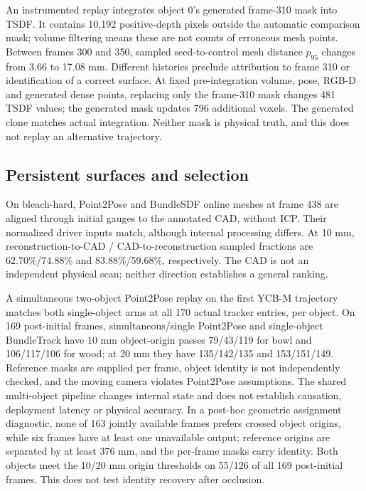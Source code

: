 \documentclass[10pt,journal]{IEEEtran}
\begin{document}
An instrumented replay integrates object 0's generated frame-310 mask into TSDF. It contains 10,192 positive-depth pixels outside the automatic comparison mask; volume filtering means these are not counts of erroneous mesh points. Between frames 300 and 350, sampled seed-to-control mesh distance $p_{95}$ changes from 3.66 to 17.08 mm. Different histories preclude attribution to frame 310 or identification of a correct surface. At fixed pre-integration volume, pose, RGB-D and generated dense points, replacing only the frame-310 mask changes 481 TSDF values; the generated mask updates 796 additional voxels. The generated clone matches actual integration. Neither mask is physical truth, and this does not replay an alternative trajectory.

\subsection{Persistent surfaces and selection}
On bleach-hard, Point2Pose and BundleSDF online meshes at frame 438 are aligned through initial gauges to the annotated CAD, without ICP. Their normalized driver inputs match, although internal processing differs. At 10 mm, reconstruction-to-CAD / CAD-to-reconstruction sampled fractions are 62.70\%/74.88\% and 83.88\%/59.68\%, respectively. The CAD is not an independent physical scan; neither direction establishes a general ranking.

A simultaneous two-object Point2Pose replay on the first YCB-M trajectory matches both single-object arms at all 170 actual tracker entries, per object. On 169 post-initial frames, simultaneous/single Point2Pose and single-object BundleTrack have 10 mm object-origin passes 79/43/119 for bowl and 106/117/106 for wood; at 20 mm they have 135/142/135 and 153/151/149. Reference masks are supplied per frame, object identity is not independently checked, and the moving camera violates Point2Pose assumptions. The shared multi-object pipeline changes internal state and does not establish causation, deployment latency or physical accuracy. In a post-hoc geometric assignment diagnostic, none of 163 jointly available frames prefers crossed object origins, while six frames have at least one unavailable output; reference origins are separated by at least 376 mm, and the per-frame masks carry identity. Both objects meet the 10/20 mm origin thresholds on 55/126 of all 169 post-initial frames. This does not test identity recovery after occlusion.
\end{document}
